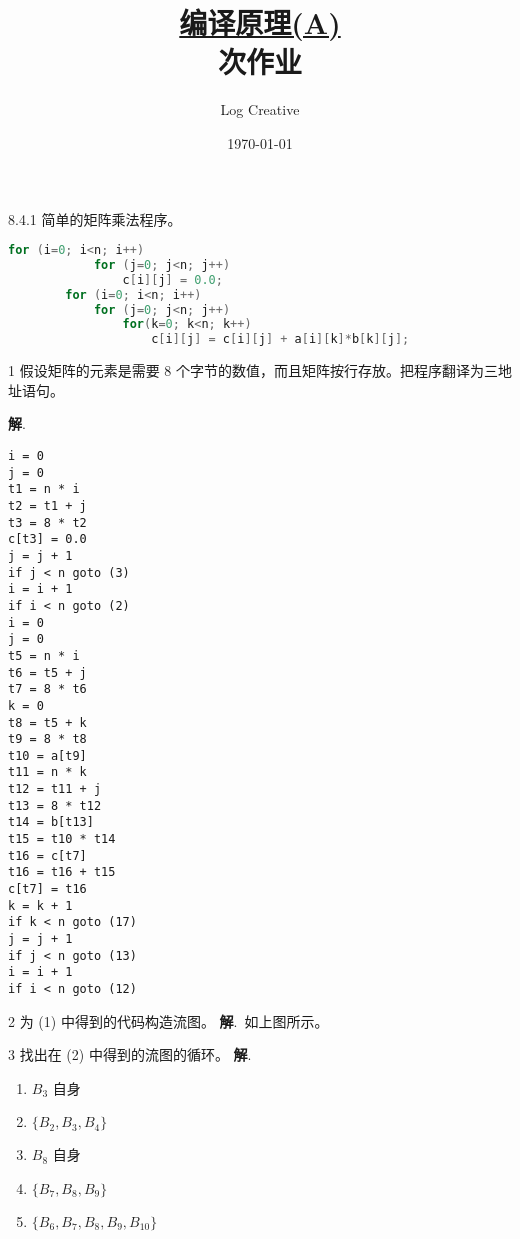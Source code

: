 \documentclass[a4paper]{article}
\newenvironment{problems}{\begin{list}{}{\renewcommand{\makelabel}[1]{\textbf{##1}\hfil}}}{\end{list}}
\newenvironment{steps}{\begin{list}{}{\renewcommand{\makelabel}[1]{##1)\hfil}}}{\end{list}}
\providecommand{\sol}{\textbf{解}.~}
\begin{document}
\title{\normalsize \underline{编译原理(A)}\\ 次作业}
\author{Log Creative }
\date{\today}
\maketitle

\begin{problems}
    \item[8.4.1] 简单的矩阵乘法程序。
    \begin{lstlisting}[language=c]
        for (i=0; i<n; i++)
            for (j=0; j<n; j++)
                c[i][j] = 0.0;
        for (i=0; i<n; i++)
            for (j=0; j<n; j++)
                for(k=0; k<n; k++)
                    c[i][j] = c[i][j] + a[i][k]*b[k][j];
    \end{lstlisting}
    \begin{steps}
        \item[1] 假设矩阵的元素是需要 8 个字节的数值，而且矩阵按行存放。把程序翻译为三地址语句。
         
        \sol 
        \begin{multicols}{2}
        \begin{lstlisting}
i = 0
j = 0
t1 = n * i
t2 = t1 + j
t3 = 8 * t2
c[t3] = 0.0
j = j + 1
if j < n goto (3)
i = i + 1
if i < n goto (2)
i = 0
j = 0
t5 = n * i
t6 = t5 + j
t7 = 8 * t6
k = 0
t8 = t5 + k
t9 = 8 * t8
t10 = a[t9]
t11 = n * k
t12 = t11 + j
t13 = 8 * t12
t14 = b[t13]
t15 = t10 * t14
t16 = c[t7]
t16 = t16 + t15
c[t7] = t16
k = k + 1
if k < n goto (17)
j = j + 1
if j < n goto (13)
i = i + 1
if i < n goto (12)
        \end{lstlisting}
        
            
    \end{multicols}
    \item[2] 为 (1) 中得到的代码构造流图。
    \sol 如上图所示。
     
    \item[3] 找出在 (2) 中得到的流图的循环。 
    \sol \begin{enumerate}
        \item $B_3$ 自身
        \item $\{B_2,B_3,B_4\}$
        \item $B_8$ 自身
        \item $\{B_7,B_8,B_9\}$
        \item $\{B_6,B_7,B_8,B_9,B_{10}\}$
    \end{enumerate}
    

\end{steps}
\end{problems}
\end{document}
